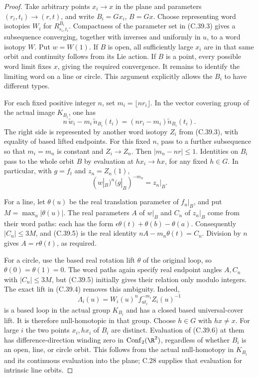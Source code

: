 \begin{proof}
Take arbitrary points $x_i\to x$ in the plane and
parameters $(r_i,t_i)\to(r,t)$, and write $B_i=Gx_i$,
$B=Gx$. Choose representing word isotopies $W_i$ for
$R^{B_i}_{r_i,t_i}$. Compactness of the parameter set
in (C.39.3) gives a subsequence converging, together
with inverses and uniformly in $u$, to a word isotopy
$W$. Put $w=W(1)$.
If $B$ is open, all sufficiently large $x_i$ are in
that same orbit and continuity follows from its
Lie action. If $B$ is a point, every possible word
limit fixes $x$, giving the required convergence.
It remains to identify the limiting word on a line
or circle. This argument explicitly allows the $B_i$
to have different types.

For each fixed positive integer $n$, set
$m_i=\lfloor nr_i\rfloor$. In the vector covering
group of the actual image $K_{B_i}$, one has
\[
 n\,\widetilde w_i
       -m_i\,\widetilde n_{B_i}(t_i)
       =(nr_i-m_i)\widetilde n_{B_i}(t_i).
                                                        \tag{C.39.4}
\]
The right side is represented by another word isotopy
$Z_i$ from (C.39.3), with equality of based lifted
endpoints. For this fixed $n$, pass to a further
subsequence so that $m_i=m_n$ is constant and
$Z_i\to Z_n$. Then $|m_n-nr|\leq1$.
Identities on $B_i$ pass to the whole orbit $B$ by
evaluation at $hx_i\to hx$, for any fixed $h\in G$.
In particular, with $g=f_t$ and $z_n=Z_n(1)$,
\[
             (w|_B)^n(g|_B)^{-m_n}=z_n|_B.
                                                        \tag{C.39.5}
\]

For a line, let $\theta(u)$ be the real translation
parameter of $f_u|_B$, and put
$M=\max_u|\theta(u)|$.
The real parameters $A$ of $w|_B$ and $C_n$ of
$z_n|_B$ come from their word paths:
each has the form
$\epsilon\theta(t)+\theta(b)-\theta(a)$.
Consequently $|C_n|\leq3M$, and (C.39.5) is the
real identity $nA-m_n\theta(t)=C_n$.
Division by $n$ gives $A=r\theta(t)$, as required.

For a circle, use the based real rotation lift
$\theta$ of the original loop, so $\theta(0)=\theta(1)=0$.
The word paths again specify real endpoint angles
$A,C_n$ with $|C_n|\leq3M$, but (C.39.5) initially
gives their relation only modulo integers.
The exact lift in (C.39.4) removes this ambiguity.
Indeed,
\[
       \Lambda_i(u)
         =W_i(u)^n f_{ut_i}^{-m_i}Z_i(u)^{-1}
                                                        \tag{C.39.6}
\]
is a based loop in the actual group $K_{B_i}$ and
has a closed based universal-cover lift.
It is therefore null-homotopic in that group.
Choose $h\in G$ with $hx\ne x$.
For large $i$ the two points $x_i,hx_i$ of $B_i$
are distinct. Evaluation of (C.39.6) at them has
difference-direction winding zero in
$\operatorname{Conf}_2(\R^2)$, regardless of whether
$B_i$ is an open, line, or circle orbit.
This follows from the actual null-homotopy in
$K_{B_i}$ and its continuous evaluation into the
plane; C.28 supplies that evaluation for intrinsic
line orbits.


\end{proof}
